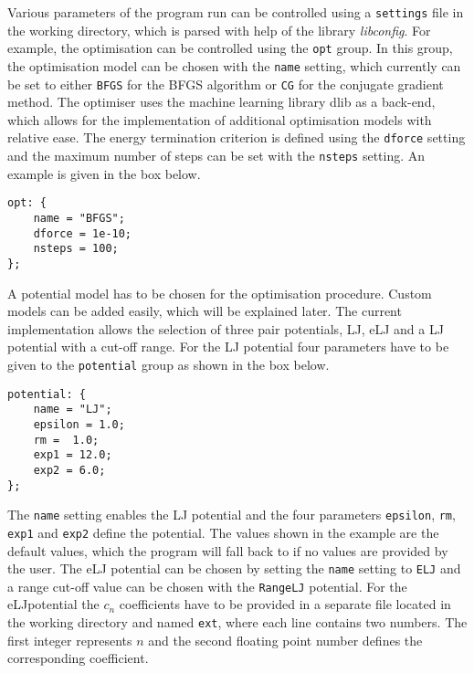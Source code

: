 Various parameters of the program run can be controlled using a
\texttt{settings} file in the working directory, which is parsed with help of
the library
\textit{libconfig}.\autocite{Lindner_libconfiglibraryprocessing_2018} For
example, the optimisation can be controlled using the \texttt{opt} group. In
this group, the optimisation model can be chosen with the \texttt{name} setting,
which currently can be set to either \texttt{BFGS} for the \ac{BFGS} algorithm
or \texttt{CG} for the conjugate gradient method. The optimiser uses the machine
learning library dlib\autocite{King_DlibmlMachineLearning_2009} as a back-end,
which allows for the implementation of additional optimisation models with
relative ease. The energy termination criterion is defined using the
\texttt{dforce} setting and the maximum number of steps can be set with the
\texttt{nsteps} setting. An example is given in the box below.
%
\begin{Verbatim}[frame=single,label=settings file - opt tag]
opt: {
    name = "BFGS";
    dforce = 1e-10;
    nsteps = 100;
};
\end{Verbatim}
%
A potential model has to be chosen for the optimisation procedure. Custom models
can be added easily, which will be explained later. The current implementation
allows the selection of three pair potentials, \ac{LJ}, \ac{eLJ} and a \ac{LJ}
potential with a cut-off range. For the \ac{LJ} potential four parameters have
to be given to the \texttt{potential} group as shown in the box below.
%
\begin{Verbatim}[frame=single,label=settings file - potential tag]
potential: {
    name = "LJ";
    epsilon = 1.0;
    rm =  1.0;
    exp1 = 12.0;
    exp2 = 6.0;
};
\end{Verbatim}
%
The \texttt{name} setting enables the \ac{LJ} potential and the four parameters
\texttt{epsilon}, \texttt{rm}, \texttt{exp1} and \texttt{exp2} define the
potential. The values shown in the example are the default values, which the
program will fall back to if no values are provided by the user. The \ac{eLJ}
potential can be chosen by setting the \texttt{name} setting to \texttt{ELJ} and
a range cut-off value can be chosen with the \texttt{RangeLJ} potential. For the
\ac{eLJ}potential the $c_n$ coefficients have to be provided in a separate file
located in the working directory and named \texttt{ext}, where each line
contains two numbers. The first integer represents $n$ and the second floating
point number defines the corresponding coefficient.

